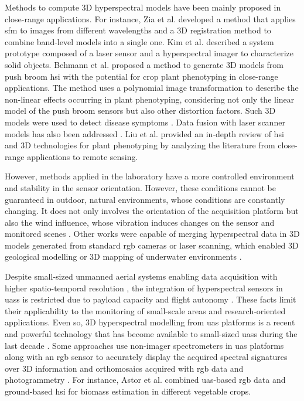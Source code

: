 Methods to compute 3D hyperspectral models have been mainly proposed in close-range applications. For instance, Zia et al. \cite{zia_3d_2015} developed a method that applies \acrshort{sfm} to images from different wavelengths and a 3D registration method to combine band-level models into a single one. Kim et al. \cite{kim_3d_2012} described a system prototype composed of a laser sensor and a hyperspectral imager to characterize solid objects. Behmann et al. \cite{behmann_calibration_2015} proposed a method to generate 3D models from push broom \acrshort{hsi} with the potential for crop plant phenotyping in close-range applications. The method uses a polynomial image transformation to describe the non-linear effects occurring in plant phenotyping, considering not only the linear model of the push broom sensors but also other distortion factors. Such 3D models were used to detect disease symptoms \cite{roscher_detection_2016}. Data fusion with laser scanner models has also been addressed \cite{behmann_generation_2016}. Liu et al. \cite{liu_hyperspectral_2020} provided an in-depth review of \acrshort{hsi} and 3D technologies for plant phenotyping by analyzing the literature from close-range applications to remote sensing.

However, methods applied in the laboratory have a more controlled environment and stability in the sensor orientation. However, these conditions cannot be guaranteed in outdoor, natural environments, whose conditions are constantly changing. It does not only involves the orientation of the acquisition platform but also the wind influence, whose vibration induces changes on the sensor and monitored scenes \cite{kalisperakis_leaf_2015}. Other works were capable of merging hyperspectral data in 3D models generated from standard \acrshort{rgb} cameras or laser scanning, which enabled 3D geological modelling \cite{nieto_3d_2010} or 3D mapping of underwater environments \cite{ferrera_hyperspectral_2021}. 

Despite small-sized unmanned aerial systems enabling data acquisition with higher spatio-temporal resolution \cite{padua_uas_2017}, the integration of hyperspectral sensors in \acrshort{uas}s is restricted due to payload capacity and flight autonomy \cite{bruning_approaches_2020}. These facts limit their applicability to the monitoring of small-scale areas and research-oriented applications. Even so, 3D hyperspectral modelling from \acrshort{uas} platforms is a recent and powerful technology that has become available to small-sized \acrshort{uas}s during the last decade \cite{nevalainen_individual_2017}. Some approaches use non-imager spectrometers in \acrshort{uas} platforms along with an \acrshort{rgb} sensor to accurately display the acquired spectral signatures over 3D information and orthomosaics acquired with \acrshort{rgb} data and photogrammetry \cite{garzonio_surface_2017}. For instance, Astor et al. \cite{astor_vegetable_2020} combined \acrshort{uas}-based \acrshort{rgb} data and ground-based \acrshort{hsi} for biomass estimation in different vegetable crops.


